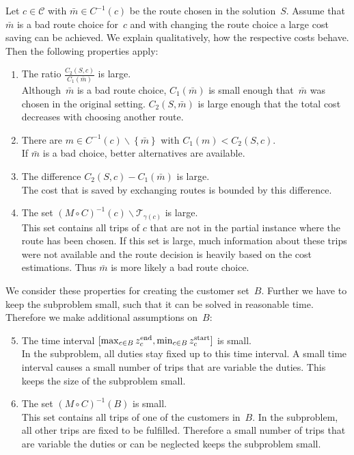 Let ${c\in\mathcal{C}}$ with ${\bar{m}\in C^{-1}(c)}$ be the route chosen in the solution~$S$. Assume that~$\bar{m}$ is a bad route choice for~$c$ and with changing the route choice a large cost saving can be achieved. We explain qualitatively, how the respective costs behave. Then the following properties apply:
\begin{enumerate}
	\item The ratio $\frac{C_2(S,c)}{C_1\left(\bar{m}\right)}$ is large. \\
	Although~$\bar{m}$ is a bad route choice, $C_1\left(\bar{m}\right)$ is small enough that~$\bar{m}$ was chosen in the original setting. $C_2\left(S,\bar{m}\right)$ is large enough that the total cost decreases with choosing another route.
	\item There are ${m\in C^{-1}(c)\backslash\left\{\bar{m}\right\}}$ with ${C_1(m)<C_2(S,c)}$. \\
	If $\bar{m}$ is a bad choice, better alternatives are available.
	\item The difference ${C_2(S,c) - C_1\left(\bar{m}\right)}$ is large. \\
	The cost that is saved by exchanging routes is bounded by this difference.
	\item The set ${(M\circ C)^{-1}(c)\backslash\mathcal{T}_{\gamma(c)}}$ is large. \\
	This set contains all trips of $c$ that are not in the partial instance where the route has been chosen. If this set is large, much information about these trips were not available and the route decision is heavily based on the cost estimations. Thus $\bar{m}$ is more likely a bad route choice.
\end{enumerate}

We consider these properties for creating the customer set~$B$. Further we have to keep the subproblem small, such that it can be solved in reasonable time. Therefore we make additional assumptions on~$B$:
\begin{enumerate}
\setcounter{enumi}{4}
	\item The time interval ${[\max_{c\in B}z^{\operatorname{end}}_c, \min_{c\in B}z^{\operatorname{start}}_c]}$ is small. \\
	In the subproblem, all duties stay fixed up to this time interval. A small time interval causes a small number of trips that are variable \wrt the duties. This keeps the size of the subproblem small.
	\item The set ${(M\circ C)^{-1}(B)}$ is small. \\
	This set contains all trips of one of the customers in~$B$. In the subproblem, all other trips are fixed to be fulfilled. Therefore a small number of trips that are variable \wrt the duties or can be neglected keeps the subproblem small.
\end{enumerate}

